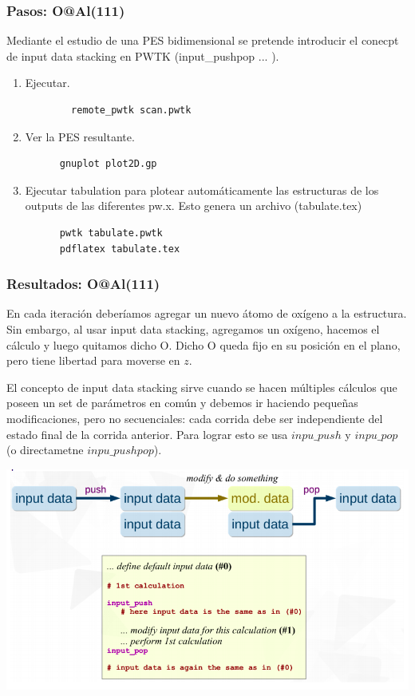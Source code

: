 \subsubsection{Pasos: O@Al(111)}

  Mediante el estudio de una PES bidimensional se pretende introducir el conecpt de input data stacking en PWTK (input\_pushpop { ... }).
  \begin{enumerate}
    \item Ejecutar.
      \begin{verbatim}
        remote_pwtk scan.pwtk
      \end{verbatim}
    \item Ver la PES resultante.
    \begin{verbatim}
      gnuplot plot2D.gp
    \end{verbatim}
    \item Ejecutar tabulation para plotear automáticamente las estructuras de los outputs de las diferentes pw.x. Esto genera un archivo (tabulate.tex)
    \begin{verbatim}
      pwtk tabulate.pwtk
      pdflatex tabulate.tex
    \end{verbatim}
  \end{enumerate}

\subsubsection{Resultados: O@Al(111)}

  En cada iteración deberíamos agregar un nuevo átomo de oxígeno a la estructura. Sin embargo, al usar input data stacking, agregamos un oxígeno, hacemos el cálculo y luego quitamos dicho O. Dicho O queda fijo en su posición en el plano,  pero tiene libertad para moverse en $z$.

  El concepto de input data stacking sirve cuando se hacen múltiples cálculos que poseen un set de parámetros en común y debemos ir haciendo pequeñas modificaciones, pero no secuenciales: cada corrida debe ser independiente del estado final de la corrida anterior. Para lograr esto se usa $inpu\_push$ y $inpu\_pop$ (o directametne $inpu\_pushpop$).

    \includegraphics[scale = 0.5]{figs/D3/pushpop.png}

